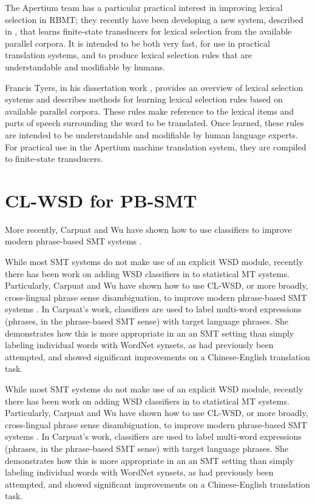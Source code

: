 The Apertium team has a particular practical interest in improving lexical
selection in RBMT; they recently have been developing
a new system, described in \cite{tyers-fst}, that learns finite-state
transducers for lexical selection from the available parallel corpora. It is
intended to be both very fast, for use in practical translation systems, and
to produce lexical selection rules that are understandable and modifiable by
humans.


Francis Tyers, in his dissertation work \cite{tyers-dissertation},
provides an overview of lexical selection systems and describes methods for
learning lexical selection rules based on available parallel corpora.
These rules make reference to the lexical items and parts of speech surrounding
the word to be translated. Once learned, these rules are intended to be
understandable and modifiable by human language experts. For practical use in
the Apertium machine translation system, they are compiled to finite-state
transducers.

\section{CL-WSD for PB-SMT}

More recently, Carpuat and Wu have
shown how to use classifiers to improve modern phrase-based SMT systems
\cite{carpuatpsd}.


While most SMT systems do not make use of an explicit WSD module, recently
there has been work on adding WSD classifiers in to statistical MT systems.
Particularly, Carpuat and Wu have shown how to use CL-WSD, or more broadly,
cross-lingual phrase sense disambiguation, to improve modern phrase-based SMT
systems
\cite{carpuatpsd,carpuat-wu:2007:EMNLP-CoNLL2007,carpuat2008evaluation}. In
Carpuat's work, classifiers are used to label multi-word expressions (phrases,
in the phrase-based SMT sense) with target language phrases. She demonstrates
how this is more appropriate in an an SMT setting than simply labeling
individual words with WordNet synsets, as had previously been attempted, and
showed significant improvements on a Chinese-English translation task.

While most SMT systems do not make use of an explicit WSD module, recently
there has been work on adding WSD classifiers in to statistical MT systems.
Particularly, Carpuat and Wu have shown how to use CL-WSD, or more broadly,
cross-lingual phrase sense disambiguation, to improve modern phrase-based SMT
systems
\cite{carpuatpsd,carpuat-wu:2007:EMNLP-CoNLL2007,carpuat2008evaluation}. In
Carpuat's work, classifiers are used to label multi-word expressions (phrases,
in the phrase-based SMT sense) with target language phrases. She demonstrates
how this is more appropriate in an an SMT setting than simply labeling
individual words with WordNet synsets, as had previously been attempted, and
showed significant improvements on a Chinese-English translation task.

